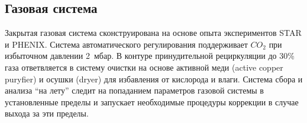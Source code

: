 

\subsection{Газовая система}\label{sec:CbmRichGasSystem}


Закрытая газовая система сконструирована на основе опыта экспериментов STAR и PHENIX.
Система автоматического регулирования поддерживает $CO_{2}$ при избыточном давлении 2~мбар.
В контуре принудительной рециркуляции до 30\% газа ответвляется в систему очистки на основе активной меди (active copper puryfier) и осушки (dryer) для избавления от кислорода и влаги.
Система сбора и анализа ``на лету'' следит на попаданием параметров газовой системы в установленные пределы и запускает необходимые процедуры коррекции в случае выхода за эти пределы.

%                                   

